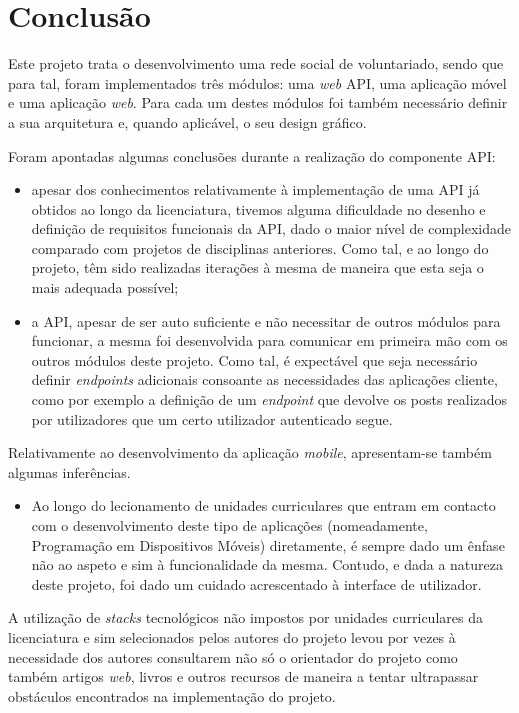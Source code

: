 \section{Conclusão}
Este projeto trata o desenvolvimento uma rede social de voluntariado, sendo que para tal, foram implementados três módulos: uma \textit{web} API, uma aplicação móvel e uma aplicação \textit{web}. Para cada um destes módulos foi também necessário definir a sua arquitetura e, quando aplicável, o seu design gráfico.

\medskip

Foram apontadas algumas conclusões durante a realização do componente API:
\begin{itemize}
	\item apesar dos conhecimentos relativamente à implementação de uma API já obtidos ao longo da licenciatura, tivemos alguma dificuldade no desenho e definição de requisitos funcionais da API, dado o maior nível de complexidade comparado com projetos de disciplinas anteriores. Como tal, e ao longo do projeto, têm sido realizadas iterações à mesma de maneira que esta seja o mais adequada possível;
	\item a API, apesar de ser auto suficiente e não necessitar de outros módulos para funcionar, a mesma foi desenvolvida para comunicar em primeira mão com os outros módulos deste projeto. Como tal, é expectável que seja necessário definir \textit{endpoints} adicionais consoante as necessidades das aplicações cliente, como por exemplo a definição de um \textit{endpoint} que devolve os posts realizados por utilizadores que um certo utilizador autenticado segue.
\end{itemize}

\medskip

Relativamente ao desenvolvimento da aplicação \textit{mobile}, apresentam-se também algumas inferências.

\begin{itemize}
	\item Ao longo do lecionamento de unidades curriculares que entram em contacto com o desenvolvimento deste tipo de aplicações (nomeadamente, Programação em Dispositivos Móveis) diretamente, é sempre dado um ênfase não ao aspeto e sim à funcionalidade da mesma. Contudo, e dada a natureza deste projeto, foi dado um cuidado acrescentado à interface de utilizador.
\end{itemize}

\medskip

A utilização de \textit{stacks} tecnológicos não impostos por unidades curriculares da licenciatura e sim selecionados pelos autores do projeto levou por vezes à necessidade dos autores consultarem não só o orientador do projeto como também artigos \textit{web}, livros e outros recursos de maneira a tentar ultrapassar obstáculos encontrados na implementação do projeto.

